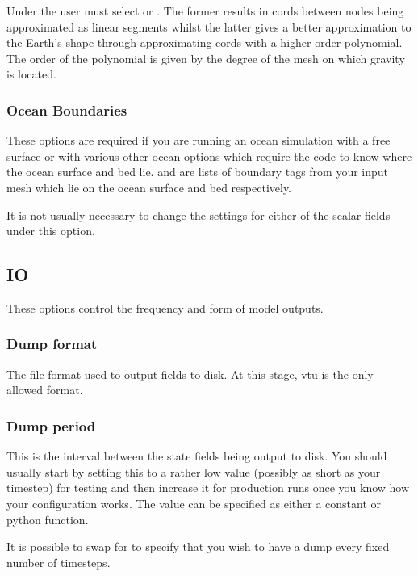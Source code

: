 Under  the user must select  or . The former results in cords between nodes being approximated as linear segments whilst the latter gives a better approximation to the Earth's shape through approximating cords with a higher order polynomial. The order of the polynomial is given by the degree of the mesh on which gravity is located.   

\subsubsection{Ocean Boundaries}\label{sec:ocean_boundaries}
These options are required if you are running an ocean simulation with a
free surface or with various other ocean options which require the code to
know where the ocean surface and bed lie.
 and
\onlypdf\linebreak{}
are lists of boundary tags from your input mesh which lie on the ocean
surface and bed respectively.

It is not usually necessary to change the settings for either of the scalar fields under this option. 

\subsection{IO}
These options control the frequency and form of model outputs.
\subsubsection{Dump format}
The file format used to output fields to disk. At this stage, vtu is the
only allowed format.

\subsubsection{Dump period}
This is the interval between the state fields being output to disk. You should usually start by setting this to a rather low value (possibly as short as your timestep) for testing and then increase it for production runs once you know how your configuration works. The value can be specified as either a constant or python function.

It is possible to swap  for  to specify that you wish to have a dump every fixed number of timesteps.

